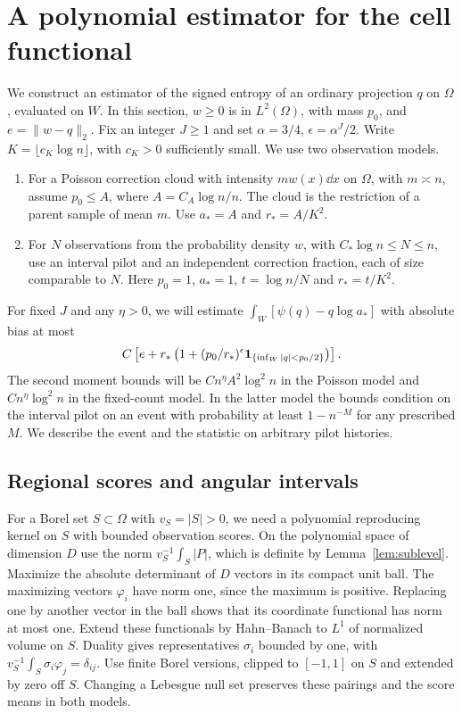 \section{A polynomial estimator for the cell functional}
\label{sec:angular}

We construct an estimator of the signed entropy of an ordinary
projection \(q\) on \(\Omega\), evaluated on \(W\).
In this section, \(w\ge0\) is in \(L^2(\Omega)\), with mass
\(p_0\), and \(e=\|w-q\|_2\). Fix an integer \(J\ge1\) and set
\(\alpha=3/4\), \(\epsilon=\alpha^J/2\).
Write \(K=\lfloor c_K\log n\rfloor\), with \(c_K>0\)
sufficiently small. We use two observation models.
\begin{enumerate}
\item For a Poisson correction cloud with intensity \(m w(x)\dd x\)
  on \(\Omega\), with \(m\asymp n\), assume \(p_0\le A\), where
  \(A=C_A\log n/n\). The cloud is the restriction of a parent
  sample of mean \(m\). Use \(a_*=A\) and \(r_*=A/K^2\).
\item For \(N\) observations from the probability density \(w\),
  with \(C_*\log n\le N\le n\), use an interval pilot and
  an independent correction fraction, each of size comparable
  to \(N\). Here \(p_0=1\), \(a_*=1\),
  \(t=\log n/N\) and \(r_*=t/K^2\).
\end{enumerate}
For fixed \(J\) and any \(\eta>0\), we will estimate
\(\int_W [\psi(q)-q\log a_*]\) with absolute bias at most
\begin{equation}\label{eq:angular-bias}
 C\left[e+r_*\left(1+(p_0/r_*)^\epsilon
                      \mathbf 1_{\{\inf_W|q|<p_0/2\}}\right)\right].
\end{equation}
The second moment bounds will be \(C n^\eta A^2\log^2 n\) in
the Poisson model and \(C n^\eta\log^2 n\) in the fixed-count
model. In the latter model the bounds condition on the interval
pilot on an event with probability at least \(1-n^{-M}\)
for any prescribed \(M\). We describe the event and the statistic
on arbitrary pilot histories.

\subsection{Regional scores and angular intervals}

For a Borel set \(S\subset\Omega\) with \(v_S=|S|>0\),
we need a polynomial reproducing kernel on \(S\) with bounded
observation scores. On the polynomial space of dimension \(D\)
use the norm \(v_S^{-1}\int_S|P|\), which is definite by
Lemma~\ref{lem:sublevel}. Maximize the absolute determinant of
\(D\) vectors in its compact unit ball. The maximizing vectors
\(\varphi_i\) have norm one, since the maximum is positive.
Replacing one by another vector in the ball shows that its
coordinate functional has norm at most one.
Extend these functionals by Hahn--Banach to \(L^1\) of normalized
volume on \(S\). Duality gives representatives
\(\sigma_i\) bounded by one, with
\(v_S^{-1}\int_S\sigma_i\varphi_j=\delta_{ij}\).
Use finite Borel versions, clipped to \([-1,1]\) on \(S\)
and extended by zero off \(S\). Changing a Lebesgue null set
preserves these pairings and the score means in both models.


